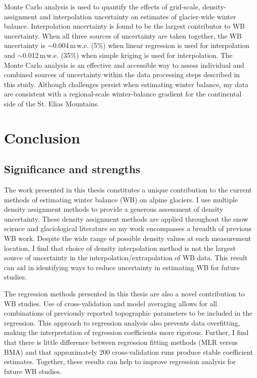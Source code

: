 \documentclass{sfuthesis}
\begin{document}
Monte Carlo analysis is used to quantify the effects of grid-scale, density-assignment and interpolation uncertainty on estimates of glacier-wide winter balance. Interpolation uncertainty is found to be the largest contributor to WB uncertainty. When all three sources of uncertainty are taken together, the WB uncertainty is $\sim$0.004\,m\,w.e. (5\%) when linear regression is used for interpolation and $\sim$0.012\,m\,w.e. (35\%) when simple kriging is used for interpolation. The Monte Carlo analysis is an effective and accessible way to assess individual and combined sources of uncertainty within the data processing steps described in this study. Although challenges persist when estimating winter balance, my data are consistent with a regional-scale winter-balance gradient for the continental side of the St. Elias Mountains. 


\chapter{Conclusion}

\section{Significance and strengths}

The work presented in this thesis constitutes a unique contribution to the current methods of estimating winter balance (WB) on alpine glaciers. I use multiple density assignment methods to provide a generous assessment of density uncertainty. These density assignment methods are applied throughout the snow science and glaciological literature so my work encompasses a breadth of previous WB work. Despite the wide range of possible density values at each measurement location, I find that choice of density interpolation method is not the largest source of uncertainty in the interpolation/extrapolation of WB data. This result can aid in identifying ways to reduce uncertainty in estimating WB for future studies. 

The regression methods presented in this thesis are also a novel contribution to WB studies. Use of cross-validation and model averaging allows for all combinations of previously reported topographic parameters to be included in the regression. This approach to regression analysis also prevents data overfitting, making the interpretation of regression coefficients more rigorous. Further, I find that there is little difference between regression fitting methods (MLR versus BMA) and that approximately 200 cross-validation runs produce stable coefficient estimates. Together, these results can help to improve regression analysis for future WB studies. 
\end{document}

